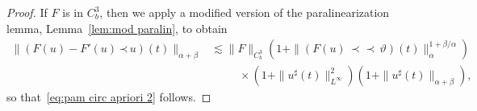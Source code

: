 \documentclass[a4paper,11pt]{article}
\theoremstyle{remark}
\newcommand{\N}{\mathbb{N}}
\newcommand{\CC}{\ensuremath{\mathscr{C}}}
\newcommand{\lpara}{\,\mathord{\prec}\,}
\newcommand{\reso}{\,\mathord{\circ}\,}
\newcommand{\mpara}{\,\mathord{\prec\!\!\!\prec}\,}
\begin{document}
\begin{proof}
   If $F$ is in $C^3_b$, then we apply a modified version of the paralinearization lemma, Lemma~\ref{lem:mod paralin}, to obtain
   \begin{align*}
      \| (F(u) - F'(u)\lpara u)(t) \|_{\alpha+\beta} & \lesssim \| F\|_{C^3_b} (1 + \| (F(u) \mpara \vartheta)(t) \|_\alpha^{1+\beta/\alpha}) \\
      &\hspace{30pt} \times (1 + \| u^\sharp(t) \|_{L^\infty}^2)(1 + \| u^\sharp(t) \|_{\alpha+\beta}),
   \end{align*}
   so that~\eqref{eq:pam circ apriori 2} follows.

\end{proof}
\end{document}
